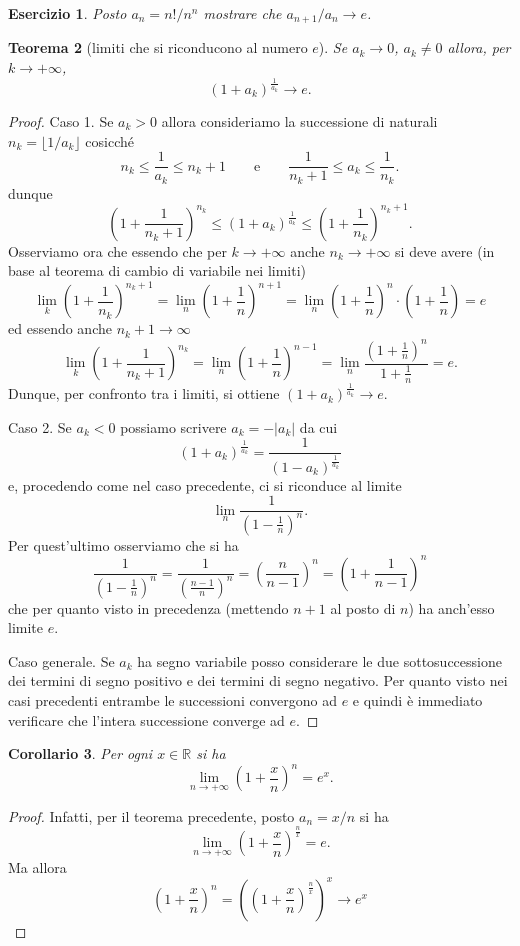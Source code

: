 \documentclass[italian,a4paper,oneside,headinclude]{scrbook}
\newcommand{\RR}{\mathbb R}
\newcommand{\abs}[1]{{\left|#1\right|}}
\newcommand{\enclose}[1]{{\left( #1 \right)}}
\newtheorem{theorem}{Teorema}
\newtheorem{exercise}[theorem]{Esercizio}
\newtheorem{corollary}[theorem]{Corollario}
\begin{document}
\begin{exercise}
Posto $a_n = n! / n^n$ mostrare che $a_{n+1} / a_n \to e$.
\end{exercise}

\begin{theorem}[limiti che si riconducono al numero $e$]
Se $a_k \to 0$, $a_k\neq 0$ allora, per $k\to +\infty$,
\[
  \enclose{1+a_k}^{\frac 1 {a_k}} \to e.
\]
\end{theorem}
%
\begin{proof}
Caso 1. Se $a_k > 0$ allora consideriamo la successione di naturali
$n_k = \lfloor 1/a_k \rfloor$ cosicché
\[
  n_k \le \frac{1}{a_k} \le n_k + 1
\qquad
\text{e}
\qquad
 \frac{1}{n_k+1} \le a_k \le \frac 1 {n_k}.
\]
dunque
\[
\enclose{1+\frac 1 {n_k+1} }^{n_k}
  \le \enclose{1+a_k}^{\frac 1 {a_k}}
  \le \enclose{1+\frac 1 {n_k}}^{n_k + 1}.
\]
Osserviamo ora che essendo che per $k\to +\infty$ anche
$n_k \to +\infty$ si deve
avere (in base al teorema di cambio di variabile nei limiti)
\[
 \lim_k \enclose{1 + \frac{1} {n_k}}^{n_k+1}\!\!\!
 = \lim_n \enclose{1+ \frac 1 n}^{n+1}\!\!\!
 = \lim_n \enclose{1+ \frac 1 n}^n\!\cdot\enclose{1+\frac 1 n}
 = e
\]
ed essendo anche $n_k + 1 \to \infty$
\[
  \lim_k \enclose{1 + \frac 1 {n_k+1}}^{n_k}
  = \lim_n \enclose{1+\frac 1 n}^{n-1}
  = \lim_n \frac{\enclose{1+\frac 1 n}^{n}}{1+\frac 1 n}
  = e.
\]
Dunque, per confronto tra i limiti, si ottiene $(1+a_k)^{\frac 1 {a_k}}\to e$.

Caso 2. Se $a_k<0$ possiamo scrivere $a_k = -\abs{a_k}$ da cui
\[
  \enclose{1+a_k}^{\frac 1 {a_k}}
  = \frac{1}{\enclose{1-a_k}^{\frac 1{a_k}}}
\]
e, procedendo come nel caso precedente, ci si riconduce al limite
\[
  \lim_n \frac{1}{\enclose{1-\frac 1 n}^n}.
\]
Per quest'ultimo osserviamo che si ha
\[
 \frac{1}{\enclose{1-\frac 1 n}^n}
 = \frac{1}{\enclose{\frac{n-1}{n}}^n}
 = \enclose{\frac{n}{n-1}}^n
 = \enclose{1 + \frac{1}{n-1}}^n
\]
che per quanto visto in precedenza (mettendo $n+1$ al posto di $n$)
ha anch'esso limite $e$.

Caso generale. Se $a_k$ ha segno variabile posso considerare
le due sottosuccessione dei termini di segno positivo e dei termini di segno
negativo. Per quanto visto nei casi precedenti entrambe le successioni
convergono ad $e$ e quindi è immediato verificare che l'intera
successione converge ad $e$.
\end{proof}

\begin{corollary}
Per ogni $x\in \RR$ si ha
\[
  \lim_{n\to +\infty} \enclose{1+ \frac x n}^n = e^x.
\]
\end{corollary}
%
\begin{proof}
Infatti, per il teorema precedente, posto $a_n = x/n$ si ha
\[
\lim_{n\to +\infty}\enclose{1+\frac x n}^{\frac n x} = e.
\]
Ma allora
\[
\enclose{1+ \frac x n}^n = \enclose{\enclose{1+\frac x n}^{\frac n x}}^x
\to e^x
\]
\end{proof}
\end{document}
